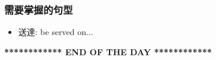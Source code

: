 \subsubsection*{需要掌握的句型}
\begin{multicols}{2}
\begin{itemize}
  \itemsep0em
  \item 送達: be served on...
\end{itemize}
\end{multicols}

\vspace{15mm}

\begin{center}
  \textbf{************ END OF THE DAY ************}
\end{center}
\newpage